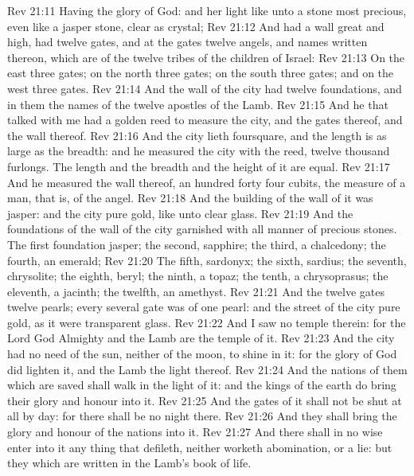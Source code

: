 \vs Rev 21:11 Having the glory of God: and her light  like unto a stone most precious, even like a jasper stone, clear as crystal;
\vs Rev 21:12 And had a wall great and high,  had twelve gates, and at the gates twelve angels, and names written thereon, which are  of the twelve tribes of the children of Israel:
\vs Rev 21:13 On the east three gates; on the north three gates; on the south three gates; and on the west three gates.
\vs Rev 21:14 And the wall of the city had twelve foundations, and in them the names of the twelve apostles of the Lamb.
\vs Rev 21:15 And he that talked with me had a golden reed to measure the city, and the gates thereof, and the wall thereof.
\vs Rev 21:16 And the city lieth foursquare, and the length is as large as the breadth: and he measured the city with the reed, twelve thousand furlongs. The length and the breadth and the height of it are equal.
\vs Rev 21:17 And he measured the wall thereof, an hundred  forty  four cubits,  the measure of a man, that is, of the angel.
\vs Rev 21:18 And the building of the wall of it was  jasper: and the city  pure gold, like unto clear glass.
\vs Rev 21:19 And the foundations of the wall of the city  garnished with all manner of precious stones. The first foundation  jasper; the second, sapphire; the third, a chalcedony; the fourth, an emerald;
\vs Rev 21:20 The fifth, sardonyx; the sixth, sardius; the seventh, chrysolite; the eighth, beryl; the ninth, a topaz; the tenth, a chrysoprasus; the eleventh, a jacinth; the twelfth, an amethyst.
\vs Rev 21:21 And the twelve gates  twelve pearls; every several gate was of one pearl: and the street of the city  pure gold, as it were transparent glass.
\vs Rev 21:22 And I saw no temple therein: for the Lord God Almighty and the Lamb are the temple of it.
\vs Rev 21:23 And the city had no need of the sun, neither of the moon, to shine in it: for the glory of God did lighten it, and the Lamb  the light thereof.
\vs Rev 21:24 And the nations of them which are saved shall walk in the light of it: and the kings of the earth do bring their glory and honour into it.
\vs Rev 21:25 And the gates of it shall not be shut at all by day: for there shall be no night there.
\vs Rev 21:26 And they shall bring the glory and honour of the nations into it.
\vs Rev 21:27 And there shall in no wise enter into it any thing that defileth, neither  worketh abomination, or  a lie: but they which are written in the Lamb's book of life.
